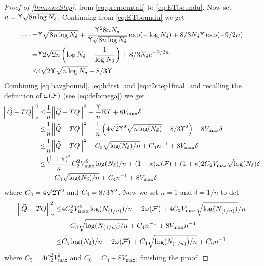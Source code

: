 \begin{proof}[Proof of \cref{thm:oneStep}]
  from \cref{eq:prenormtail} to \cref{eq:ETboundu}.
  Now set $u = \Upupsilon \sqrt{8 n \log N_\delta}$.
  Continuing from \cref{eq:ETboundu} we get
  \begin{align}
    \dots = & \Upupsilon \sqrt{8 n \log N_\delta}
    + \frac{\Upupsilon^2 8 n N_\delta}{\Upupsilon \sqrt{8 n \log N_\delta}}
    \exp(-\log N_\delta) + 8/3 N_\delta \Upupsilon \exp(-9/2 n)
    \\ = & \Upupsilon 2 \sqrt{2n} \left( \log N_\delta + \frac{1}{\log N_\delta} \right)
    + 8/3 N_\delta e^{-9/2 n}
    \\ \leq & 4 \sqrt{2} \Upupsilon \sqrt{n \log N_\delta} + 8/3 \Upupsilon
    \label{eq:ETbound}
  \end{align}
  Combining \cref{eq:havgbound}, \cref{eq:hfirst} and \cref{eq:c2step1final}
  and recalling the definition of $\omega(\mathcal{F})$ (see \cref{eq:defomega})
  we get
  \begin{align}
    \norm{\widehat{Q} - TQ}^2_\nu
    \leq & \frac{1}{n} \norm{\widehat{Q} - TQ}^2 + \frac{\Upupsilon}{n} \mathbb{E} T
    + 8 V_{\max} \delta
    \\ \leq & \frac{1}{n} \norm{\widehat{Q} - TQ}^2 + \frac{1}{n}
    \left(4\sqrt{2} \Upupsilon^2 \sqrt{n \log(N_\delta)} + 8/3 \Upupsilon^2 \right)
    + 8 V_{\max} \delta
    \\ \leq & \frac{1}{n} \norm{\widehat{Q} - TQ}^2
    + C_3 \sqrt{\log(N_\delta)/n} + C_4 n^{-1}
    + 8 V_{\max} \delta
    \\ \leq & \frac{(1 + \kappa)^2}{\kappa} C_2^2 V_{\max}^2 \log(N_\delta)/n
    + (1 + \kappa) \omega(\mathcal{F}) + (1 + \kappa) 2 C_2 V_{\max}
    \sqrt{\log(N_\delta)} \delta
    \notag
    \\ & + C_3 \sqrt{\log(N_\delta)/n} + C_4 n^{-1}
    + 8 V_{\max} \delta
   \label{eq:C2final}
  \end{align}
  where $C_3 = 4\sqrt{2} \Upupsilon^2$ and $C_4 = 8/3 \Upupsilon^2$.
  Now we set $\kappa = 1$ and $\delta = 1/n$ to det
  \begin{align}
    \norm{\widehat{Q} - TQ}_\nu^2
    \leq & 4 C_2^2 V_{\max}^2 \log(N_{(1/n)})/n
    + 2 \omega(\mathcal{F}) + 4 C_2 V_{\max}
    \sqrt{\log(N_{(1/n)})}/n
    \notag
    \\ & + C_3 \sqrt{\log(N_{(1/n)})/n} + C_4 n^{-1}
    + 8 V_{\max} n^{-1} 
    \\
    \leq & C_5 \log(N_\delta)/n
    + 2 \omega(\mathcal{F})
    + C_3 \sqrt{\log(N_{(1/n)})/n} + C_6 n^{-1}
  \end{align}
  where $C_5 = 4 C_2^2 V_{\max}^2$ and $C_6 = C_4 + 8 V_{\max}$,
  finishing the proof.
\end{proof}



